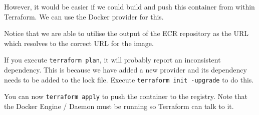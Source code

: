 \documentclass{csse4400}
\begin{document}
However, it would be easier if we could build and push this container from within Terraform.
We can use the Docker provider for this.


Notice that we are able to utilise the output of the ECR repository as the URL which resolves to the correct URL for the image.

If you execute \texttt{terraform plan}, it will probably report an inconsistent dependency.
This is because we have added a new provider and its dependency needs to be added to the lock file.
Execute \texttt{terraform init -upgrade} to do this.

You can now \texttt{terraform apply} to push the container to the registry.
Note that the Docker Engine / Daemon must be running so Terraform can talk to it.



\end{document}
